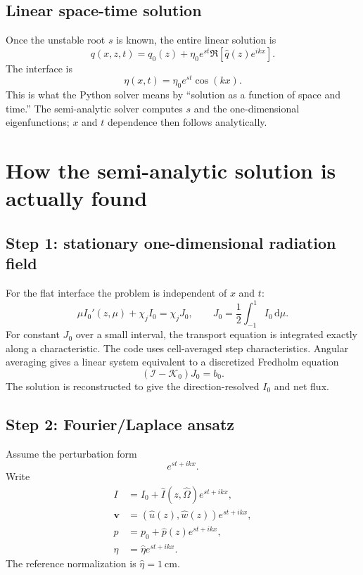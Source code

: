 \documentclass[11pt]{article}
\newcommand{\vect}[1]{\bm{#1}}
\newcommand{\Oh}{\hat{\Omega}}
\newcommand{\dd}{\mathrm{d}}
\newcommand{\Ihat}{\widehat I}
\newcommand{\whatv}{\widehat w}
\newcommand{\uhat}{\widehat u}
\newcommand{\phat}{\widehat p}
\begin{document}
\subsection{Linear space-time solution}
Once the unstable root $s$ is known, the entire linear solution is
\begin{equation}
q(x,z,t)=q_0(z)+\eta_0e^{st}\Re\left[\widehat q(z)e^{ikx}\right].
\end{equation}
The interface is
\begin{equation}
\boxed{\eta(x,t)=\eta_0e^{st}\cos(kx).}
\end{equation}
This is what the Python solver means by ``solution as a function of space and time.'' The semi-analytic solver computes $s$ and the one-dimensional eigenfunctions; $x$ and $t$ dependence then follows analytically.

\section{How the semi-analytic solution is actually found}

\subsection{Step 1: stationary one-dimensional radiation field}
For the flat interface the problem is independent of $x$ and $t$:
\begin{equation}
\mu I_0'(z,\mu)+\chi_j I_0=\chi_jJ_0,
\qquad
J_0=\frac12\int_{-1}^{1}I_0\,\dd\mu.
\end{equation}
For constant $J_0$ over a small interval, the transport equation is integrated exactly along a characteristic. The code uses cell-averaged step characteristics. Angular averaging gives a linear system equivalent to a discretized Fredholm equation
\begin{equation}
(\mathcal I-\mathcal K_0)J_0=b_0.
\end{equation}
The solution is reconstructed to give the direction-resolved $I_0$ and net flux.

\subsection{Step 2: Fourier/Laplace ansatz}
Assume the perturbation form
\begin{equation}
e^{st+ikx}.
\end{equation}
Write
\begin{align}
I&=I_0+\Ihat(z,\Oh)e^{st+ikx},\\
\vect v&=(\uhat(z),\whatv(z))e^{st+ikx},\\
p&=p_0+\phat(z)e^{st+ikx},\\
\eta&=\widehat\eta e^{st+ikx}.
\end{align}
The reference normalization is $\widehat\eta=1\ \mathrm{cm}$.
\end{document}
